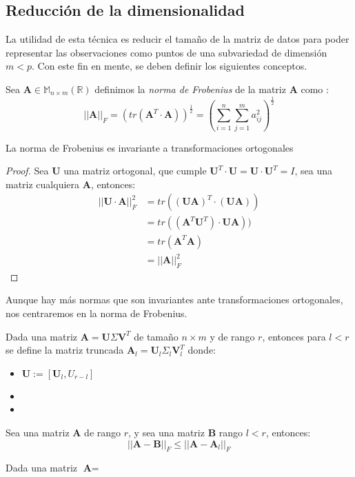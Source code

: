 \subsection{Reducción de la dimensionalidad}

\noindent La utilidad de esta técnica es reducir el tamaño de la matriz de datos para poder representar las observaciones como puntos de una subvariedad de dimensión $m < p$. Con este fin en mente, se deben definir los siguientes conceptos.
\begin{defi}
Sea $\textbf{A}\in \mathbb{M}_{n\times m}(\mathbb{R})$ definimos la \textit{norma de Frobenius} de la matriz \textbf{A} como :
\begin{equation}
||\textbf{A}||_F=(tr(\textbf{A}^T\cdot \textbf{A}))^{\frac{1}{2}}=\left(\sum_{i=1}^{n}\sum _{j=1}^{m}a_{ij}^2\right)^{\frac{1}{2}}
\end{equation}
\end{defi}

\begin{propo}
La norma de Frobenius es invariante a transformaciones ortogonales
\begin{proof}
Sea $\mathbf{U}$ una matriz ortogonal, que cumple $\mathbf{U}^T\cdot \mathbf{U}=\mathbf{U}\cdot \mathbf{U}^T=I$, sea una matriz cualquiera $\mathbf{A}$, entonces:
\begin{align*}\tag{2.7}
||\mathbf{U} \cdot \mathbf{A}||_F^2&=tr((\mathbf{U} \mathbf{A})^T\cdot(\mathbf{U} \mathbf{A}))\\
&=tr((\mathbf{A}^T \mathbf{U}^T)\cdot \mathbf{U} \mathbf{A}))\\
&=tr(\mathbf{A}^T \mathbf{A})\\
&=||\mathbf{A}||_F^2
\end{align*}
\qedhere
\end{proof}
\end{propo}

\noindent Aunque hay más normas que son invariantes ante transformaciones ortogonales, nos centraremos en la norma de Frobenius.

\begin{defi}
Dada una matriz $\textbf{A}=\textbf{U}\Sigma \textbf{V}^T$ de tamaño $n\times m $ y de rango $r$, entonces para $l < r$ se define la matriz truncada  $\textbf{A}_l=\textbf{U}_l \Sigma_l \textbf{V}^T_l$ donde: 
\begin{itemize}
\item $\textbf{U}:=[\textbf{U}_l, U_{r-l}]$
\item 
\item
\end{itemize}
\end{defi}

\begin{teorema}
Sea una matriz $\textbf{A}$ de rango $r$, y sea una matriz $\textbf{B}$ rango $l<r$, entonces:
\begin{equation}
||\textbf{A}-\textbf{B}||_F \leq ||\textbf{A}-\textbf{A}_l||_F
\end{equation}
\end{teorema}
\begin{propo}
Dada una matriz $\textbf{A}=$
\end{propo}





